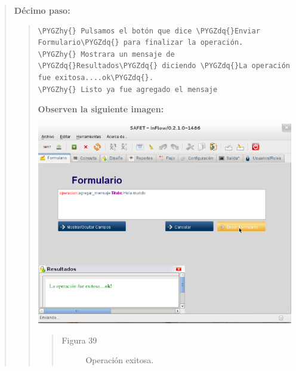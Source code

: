 \documentclass[letterpaper,11pt,spanish]{sphinxmanual}
\def\PYGZhy{\char`\-}
\def\PYGZdq{\char`\"}
\begin{document}
\begin{quote}
\begin{quote}
\begin{quote}
\begin{description}
\end{description}\end{quote}
\end{quote}

\textbf{Décimo paso:}
\begin{quote}

\begin{Verbatim}[commandchars=\\\{\}]
\PYGZhy{} Pulsamos el botón que dice \PYGZdq{}Enviar Formulario\PYGZdq{} para finalizar la operación.
\PYGZhy{} Mostrara un mensaje de \PYGZdq{}Resultados\PYGZdq{} diciendo \PYGZdq{}La operación fue exitosa....ok\PYGZdq{}.
\PYGZhy{} Listo ya fue agregado el mensaje
\end{Verbatim}

\textbf{Observen la siguiente imagen:}

\includegraphics{inflow14.png}
\begin{quote}\begin{description}
\item[{Figura 39}] \leavevmode
Operación exitosa.

\end{description}\end{quote}
\end{quote}
\end{quote}
\end{document}
